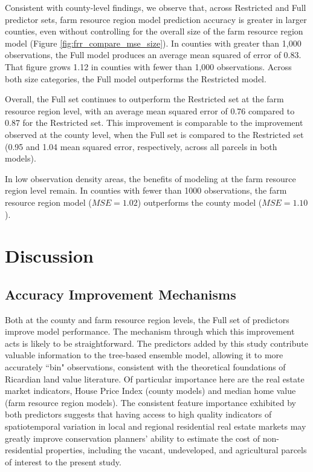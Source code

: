 \documentclass[12pt]{article}
\begin{document}
Consistent with county-level findings, we observe that, across Restricted and Full predictor sets, farm resource region model prediction accuracy is greater in larger counties, even without controlling for the overall size of the farm resource region model (Figure \ref{fig:frr_compare_mse_size}). In counties with greater than 1,000 observations, the Full model produces an average mean squared of error of 0.83. That figure grows 1.12 in counties with fewer than 1,000 observations. Across both size categories, the Full model outperforms the Restricted model.

Overall, the Full set continues to outperform the Restricted set at the farm resource region level, with an average mean squared error of 0.76 compared to 0.87 for the Restricted set. This improvement is comparable to the improvement observed at the county level, when the Full set is compared to the Restricted set (0.95 and 1.04 mean squared error, respectively, across all parcels in both models). 

In low observation density areas, the benefits of modeling at the farm resource region level remain. In counties with fewer than 1000 observations, the farm resource region model ($MSE=1.02$) outperforms the county model ($MSE=1.10$).

\section{Discussion}

\subsection{Accuracy Improvement Mechanisms}

Both at the county and farm resource region levels, the Full set of predictors improve model performance. The mechanism through which this improvement acts is likely to be straightforward. The predictors added by this study contribute valuable information to the tree-based ensemble model, allowing it to more accurately ``bin" observations, consistent with the theoretical foundations of Ricardian land value literature. Of particular importance here are the real estate market indicators, House Price Index (county models) and median home value (farm resource region models). The consistent feature importance exhibited by both predictors suggests that having access to high quality indicators of spatiotemporal variation in  local and regional residential real estate markets may greatly improve conservation planners' ability to estimate the cost of non-residential properties, including the vacant, undeveloped, and agricultural parcels of interest to the present study.
\end{document}
